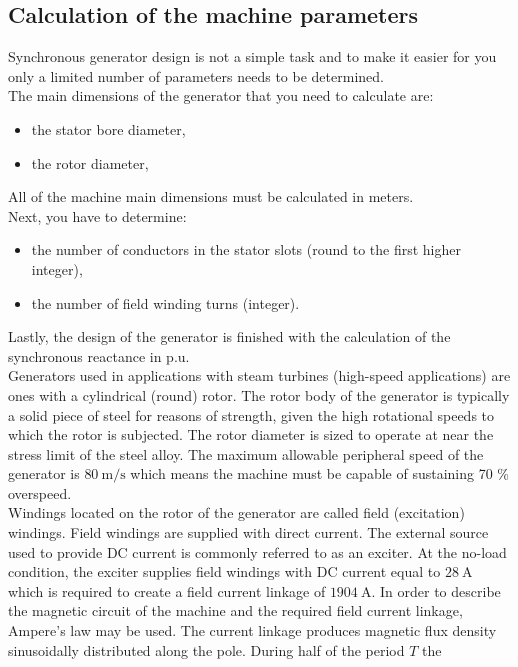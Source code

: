\documentclass[openany]{book}
\begin{document}
	\subsection{Calculation of the machine parameters}
	Synchronous generator design is not a simple task and to make it easier for 
	you only a limited  number of parameters needs to be determined. 
	\\The main dimensions of the generator that you need to calculate are:
	\begin{itemize}
		\item the stator bore diameter,
		\item the rotor diameter,
	\end{itemize}
	All of the machine main dimensions must be calculated in meters.
	\\Next, you have to determine:
	\begin{itemize}
		\item the number of conductors in the stator slots (round to the first 
		higher integer),
		\item the number of field winding turns (integer).
	\end{itemize} 
	Lastly, the design of the generator is finished with the calculation of the 
	synchronous reactance in p.u. 
	\\Generators used in applications with steam turbines (high-speed 
	applications) are ones with a cylindrical (round) rotor. The rotor body of 
	the generator is typically a solid piece of steel for reasons of strength, 
	given the high rotational speeds to which the rotor is subjected. The rotor 
	diameter is sized to operate at near the stress limit of the steel alloy. 
	The maximum allowable peripheral speed of the generator is $80\ 
	\mathrm{m/s}$ which means the machine must be capable of sustaining 70 \% 
	overspeed. 
	\\Windings located on the rotor of the generator are called field 
	(excitation) windings. Field windings are supplied with direct current. The 
	external source used to provide DC current is commonly referred to as an 
	exciter. At the no-load condition, the exciter supplies field windings with 
	DC current equal to $28\ \mathrm{A}$ which is required to create a field 
	current linkage of $1904\ \mathrm{A}$. In order to describe the magnetic 
	circuit of the machine and the required field current linkage, Ampere's law 
	may be used. The current linkage produces magnetic flux density 
	sinusoidally distributed along the pole. During half of the period $T$ the 
\end{document}
